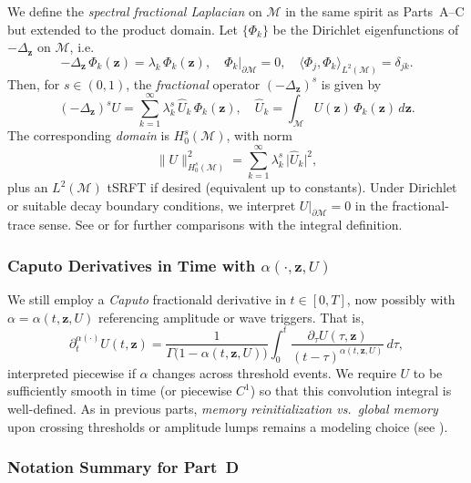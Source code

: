 \documentclass[12pt]{article}
\begin{document}
We define the \emph{spectral fractional Laplacian} on $\mathcal{M}$ in the same spirit as 
Parts~A--C but extended to the product domain. Let $\{\Phi_k\}$ be the Dirichlet 
eigenfunctions of $-\Delta_{\mathbf{z}}$ on $\mathcal{M}$, i.e.\
\[
-\Delta_{\mathbf{z}} \,\Phi_k(\mathbf{z})
=
\lambda_k \,\Phi_k(\mathbf{z}),
\quad
\Phi_k\big|_{\partial\mathcal{M}}=0,
\quad
\langle \Phi_j,\Phi_k\rangle_{L^2(\mathcal{M})}
=
\delta_{jk}.
\]
Then, for $s\in(0,1)$, the \emph{fractional} operator $(-\Delta_{\mathbf{z}})^s$ is given by
\[
(-\Delta_{\mathbf{z}})^s U
=
\sum_{k=1}^\infty
  \lambda_k^s \,\widehat{U}_k \,\Phi_k(\mathbf{z}),
\quad
\widehat{U}_k
=
\int_{\mathcal{M}}
  U(\mathbf{z})\,\Phi_k(\mathbf{z})
\,d\mathbf{z}.
\]
The corresponding \emph{domain} is $H_0^s(\mathcal{M})$, with norm
\[
\|U\|_{H_0^s(\mathcal{M})}^2
=
\sum_{k=1}^\infty
  \lambda_k^s \,\lvert \widehat{U}_k\rvert^2,
\]
plus an $L^2(\mathcal{M})$ tSRFT if desired (equivalent up to constants). Under Dirichlet 
or suitable decay boundary conditions, we interpret $U|_{\partial\mathcal{M}}=0$ in the 
fractional-trace sense. See \cite{DiNezzaPalatucciValdinoci} or \cite[Ch.~1]{Kilbas2006} 
for further comparisons with the integral definition.

\subsubsection{Caputo Derivatives in Time with \texorpdfstring{\(\alpha(\cdot,\mathbf{z},U)\)}{}}
\label{subsubsec:caputo_time_M}

We still employ a \emph{Caputo} fractionald derivative in $t\in[0,T]$, now possibly with 
\(\alpha=\alpha(t,\mathbf{z},U)\) referencing amplitude or wave triggers. That is,
\[
\partial_t^{\alpha(\cdot)} U(t,\mathbf{z})
=
\frac{1}{\Gamma\bigl(1-\alpha(t,\mathbf{z},U)\bigr)}
\int_0^t
  \frac{\partial_\tau U(\tau,\mathbf{z})}{
         (t-\tau)^{\alpha(t,\mathbf{z},U)}}
\,d\tau,
\]
interpreted piecewise if $\alpha$ changes across threshold events. 
We require $U$ to be sufficiently smooth in time (or piecewise $C^1$) so that 
this convolution integral is well-defined. As in previous parts, \emph{memory 
reinitialization vs.\ global memory} upon crossing thresholds or amplitude lumps 
remains a modeling choice (see \cite{Magin2006,Sun2019}).

\subsubsection{Notation Summary for Part~D}
\end{document}
